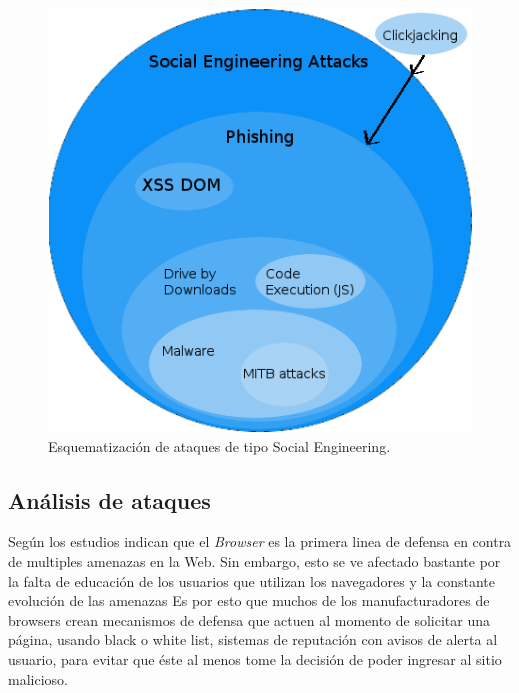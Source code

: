     \begin{figure}[h!t]
        \centering
        \includegraphics[scale=0.5]{figures/SEAttacks.png}
        \caption{Esquematización de ataques de tipo Social Engineering.}
        \label{fig:SEattack}
    \end{figure}

    \subsection{Análisis de ataques}
    Según los estudios \cite{browSecPhish, Labs2013, rowSecSEMBlock} indican que el \textit{Browser} es la primera linea de defensa en contra de multiples amenazas en la Web. Sin embargo, esto se ve afectado bastante por la falta de educación de los usuarios que utilizan los navegadores y la constante evolución de las amenazas \cite{browSecPhish} Es por esto que muchos de los manufacturadores de browsers crean mecanismos de defensa \cite{Drake2011} que actuen al momento de solicitar una página, usando black o white list, sistemas de reputación \cite{Rajab2013} con avisos de alerta al usuario, para evitar que éste al menos tome la decisión de poder ingresar al sitio malicioso.

